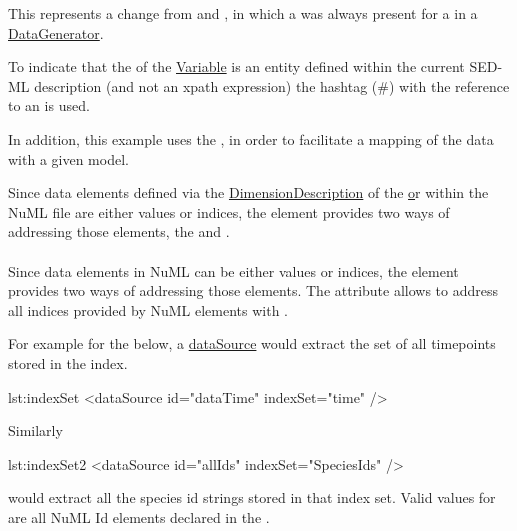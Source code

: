 This represents a change from \LoneVone and \LoneVtwo, in which a  was always present for a  in a \hyperref[class:dataGenerator]{DataGenerator}.

To indicate that the \hyperref[sec:target]{} of the \hyperref[class:variable]{Variable} is an entity defined within the current SED-ML description (and not an xpath expression) the hashtag (\#) with the reference to an \hyperref[type:id]{} is used. 

In addition, this example uses the \hyperref[sec:modelReference]{}, in order to facilitate a mapping of the data with a given model. 

Since data elements defined via the \hyperref[class:dimensionDescription]{DimensionDescription} of the \hyperref[class:dataDescription] or within the NuML file are either values or indices, the \SedDataSource element provides two ways of addressing those elements, the \hyperref[sec:indexSet]{} and \hyperref[sec:listOfSlices]{}. 

\paragraph*{}
\label{sec:indexSet}
Since data elements in NuML can be either values or indices, the \SedDataSource element provides two ways of addressing those elements. The  attribute allows to address all indices provided by NuML elements with . 

For example for the   below, a \hyperref[class:dataSource]{dataSource} would extract the set of all timepoints stored in the index.

\begin{myXmlLst}{}{lst:indexSet}
<dataSource id="dataTime" indexSet="time" />
\end{myXmlLst} 

Similarly

\begin{myXmlLst}{}{lst:indexSet2}
<dataSource id="allIds" indexSet="SpeciesIds" />
\end{myXmlLst} 

would extract all the species id strings stored in that index set. Valid values for  are all NuML Id elements declared in the . 

